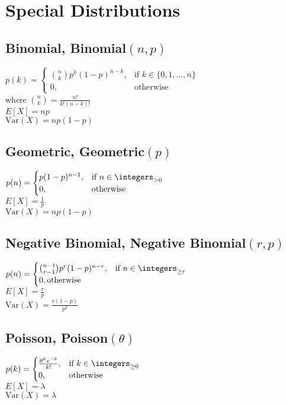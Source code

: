 \section{Special Distributions}

\subsection*{Binomial, \textnormal{Binomial}\((n, p)\)}
\(
  p(k) =
  \begin{cases}
    \binom{n}{k} p^k (1-p)^{n-k}, & \text{if }k \in \{0, 1, \dotsc, n\}\\
    0, & \text{otherwise}
  \end{cases}
\)\\
where \(\binom{n}{k} = \frac{n!}{k!(n-k)!}\)\\
\(E[X] = np\)\\
\(\text{Var}(X) = np(1-p)\)

\subsection*{Geometric, \textnormal{Geometric}\((p)\)}
\(
  p(n) =
  \begin{cases}
    p(1-p)^{n-1}, & \text{if } n \in \integers_{> 0}\\
    0, & \text{otherwise}
  \end{cases}
\)\\
\(E[X] = \frac{1}{p}\)\\
\(\text{Var}(X) = np(1-p)\)

\subsection*{Negative Binomial, \textnormal{Negative Binomial}\((r, p)\)}
\(
  p(n) =
  \begin{cases}
    \binom{n-1}{r-1} p^r (1-p)^{n-r}, & \text{if } n \in \integers_{\ge r}\\
    0, \text{otherwise}
  \end{cases}
\)\\
\(E[X] = \frac{r}{p}\)\\
\(\text{Var}(X) = \frac{r(1-p)}{p^2}\)

\subsection*{Poisson, \textnormal{Poisson}\((\theta)\)}
\(
  p(k) =
  \begin{cases}
    \frac{\theta^k e^{-\theta}}{k!}, & \text{if } k \in \integers_{\ge 0}\\
    0, & \text{otherwise}
  \end{cases}
\)\\
\(E[X] = \lambda\)\\
\(\text{Var}(X) = \lambda\)

